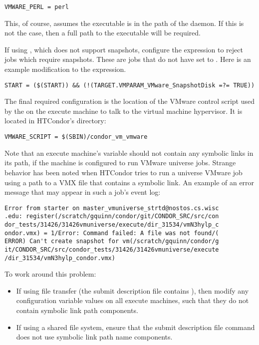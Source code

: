 \begin{verbatim}
VMWARE_PERL = perl
\end{verbatim}

This, of course, assumes the  executable is in the path
of the  daemon.
If this is not the case,
then a full path to the  executable will be required.

If using , 
which does not support snapshots,
configure the  expression to reject
jobs which require snapshots.
These are jobs that do not have 
 set to .
Here is an example modification to the  expression. 
\begin{verbatim}
START = ($(START)) && (!(TARGET.VMPARAM_VMware_SnapshotDisk =?= TRUE))
\end{verbatim}

The final required configuration is the location of the VMware control script
used by the  on the execute machine
to talk to the virtual machine hypervisor.
It is located in HTCondor's  directory:

\begin{verbatim}
VMWARE_SCRIPT = $(SBIN)/condor_vm_vmware
\end{verbatim}

Note that an execute machine's  variable should not
contain any symbolic links in its path,
if the machine is configured to run VMware  universe jobs.
Strange behavior has been noted when HTCondor tries to run a 
 universe VMware
job using a path to a VMX file that contains a symbolic link.
An example of an error message that may appear in such a job's event log:
\begin{verbatim}
Error from starter on master_vmuniverse_strtd@nostos.cs.wisc
.edu: register(/scratch/gquinn/condor/git/CONDOR_SRC/src/con
dor_tests/31426/31426vmuniverse/execute/dir_31534/vmN3hylp_c
ondor.vmx) = 1/Error: Command failed: A file was not found/(
ERROR) Can't create snapshot for vm(/scratch/gquinn/condor/g
it/CONDOR_SRC/src/condor_tests/31426/31426vmuniverse/execute
/dir_31534/vmN3hylp_condor.vmx)
\end{verbatim}
To work around this problem:
\begin{itemize}
\item If using file transfer
(the submit description file contains
),
then modify any
configuration variable  values on all execute machines,
such that they do not contain symbolic link path components.
\item If using a shared file system, ensure that the
submit description file command
 does not use
symbolic link path name components.
\end{itemize}


